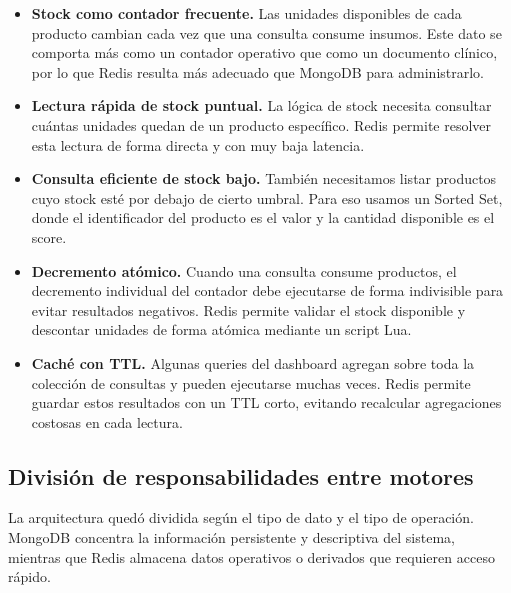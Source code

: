\documentclass[10pt,a4paper]{article}
\begin{document}
\begin{itemize}
    \item \textbf{Stock como contador frecuente.} Las unidades disponibles de cada producto cambian cada vez que una consulta consume insumos. Este dato se comporta más como un contador operativo que como un documento clínico, por lo que Redis resulta más adecuado que MongoDB para administrarlo.

    \item \textbf{Lectura rápida de stock puntual.} La lógica de stock necesita consultar cuántas unidades quedan de un producto específico. Redis permite resolver esta lectura de forma directa y con muy baja latencia.

    \item \textbf{Consulta eficiente de stock bajo.} También necesitamos listar productos cuyo stock esté por debajo de cierto umbral. Para eso usamos un Sorted Set, donde el identificador del producto es el valor y la cantidad disponible es el score.

    \item \textbf{Decremento atómico.} Cuando una consulta consume productos, el decremento individual del contador debe ejecutarse de forma indivisible para evitar resultados negativos. Redis permite validar el stock disponible y descontar unidades de forma atómica mediante un script Lua.

    \item \textbf{Caché con TTL.} Algunas queries del dashboard agregan sobre toda la colección de consultas y pueden ejecutarse muchas veces. Redis permite guardar estos resultados con un TTL corto, evitando recalcular agregaciones costosas en cada lectura.
\end{itemize}

\subsection{División de responsabilidades entre motores}

La arquitectura quedó dividida según el tipo de dato y el tipo de operación. MongoDB concentra la información persistente y descriptiva del sistema, mientras que Redis almacena datos operativos o derivados que requieren acceso rápido.
\end{document}
